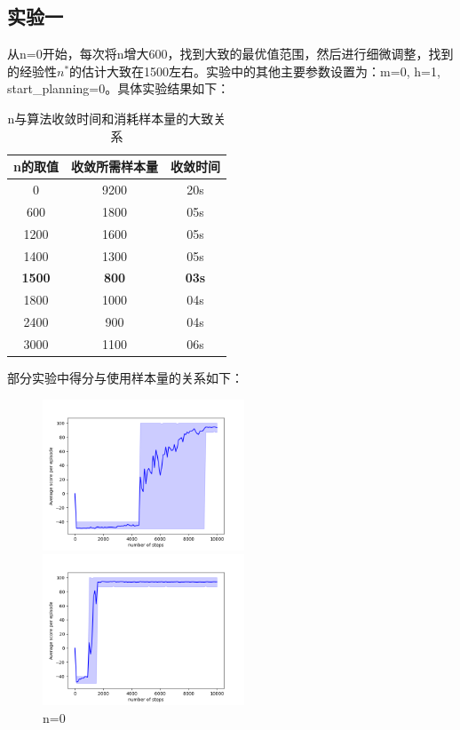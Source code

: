 \documentclass[a4paper,12pt]{article}
\begin{document}
\begin{CJK}{UTF8}{gbsn}
\subsection{实验一}
从n=0开始，每次将n增大600，找到大致的最优值范围，然后进行细微调整，找到的经验性$n^*$的估计大致在1500左右。实验中的其他主要参数设置为：m=0, h=1, start\_planning=0。具体实验结果如下：
\begin{table}[H]
	\renewcommand{\arraystretch}{1.2}
	\caption{n与算法收敛时间和消耗样本量的大致关系}
	\centering
	\begin{tabular}{ccc}
		\hline
		n的取值& 收敛所需样本量& 收敛时间\\
		\hline
		0& 9200 & 20s\\
		600& 1800 & 05s\\
		1200& 1600 & 05s\\
		1400& 1300 & 05s\\
		\textbf{1500}& \textbf{800} & \textbf{03s}\\
		1800& 1000 & 04s\\
		2400& 900 & 04s\\
		3000& 1100 & 06s\\
		\hline
	\end{tabular}
\end{table}
部分实验中得分与使用样本量的关系如下：
\begin{figure}[htbp]
	\centering
	\begin{minipage}[t]{0.45\textwidth}
		\centering
		\includegraphics[width=6cm]{resource/n=0/performance.png}
		\caption{n=0}
	\end{minipage}
	\begin{minipage}[t]{0.45\textwidth}
		\centering
		\includegraphics[width=6cm]{resource/n=1200/performance.png}

\end{minipage}
\end{figure}
\end{CJK}
\end{document}
